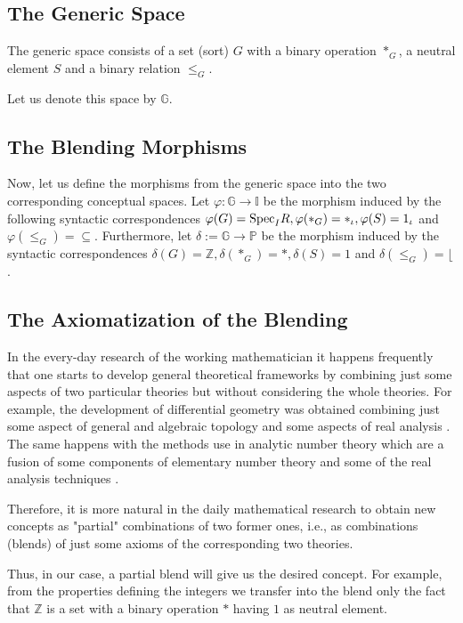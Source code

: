 \subsection{The Generic Space}

The generic space consists of a set (sort) $G$ with a binary operation $*_G$, a neutral element $S$ and a binary relation $\leq_G$.

  Let us denote this space by $\mathbb{G}$.

\subsection{The Blending Morphisms}
Now, let us define the morphisms from the generic space into the two corresponding conceptual spaces. Let $\varphi: \mathbb{G}\rightarrow \mathbb{I}$ be the morphism induced by the following syntactic correspondences $\varphi(G)={\rm Spec}_IR,\varphi(*_G)=*_{\iota}, \varphi(S)=1_{\iota}$ and $\varphi(\leq_G)=\subseteq$.
\newline\indent
Furthermore, let $\delta:=\mathbb{G}\rightarrow\mathbb{P}$ be the morphism induced by the syntactic correspondences $\delta(G)=\mathbb{Z}, \delta(*_G)=*, \delta(S)=1$ and $\delta(\leq_G)= \big\lfloor$.

\subsection{The Axiomatization of the Blending}
In the every-day research of the working mathematician it happens
frequently that one starts to develop general theoretical frameworks
by combining just some aspects of two particular theories but without
considering the whole theories. For example, the development of
differential geometry was obtained combining just some aspect of
general and algebraic topology and some aspects of real analysis
\parencite{VelCad05}. The same happens with the methods use in
analytic number theory which are a fusion of some components of
elementary number theory and some of the real analysis techniques
\parencite{Apostol76}.

Therefore, it is more natural in the daily mathematical research to obtain new concepts as "partial" combinations of two former ones, i.e., as combinations (blends) of just some axioms of the corresponding two theories.
 
Thus, in our case, a partial blend will give us the desired concept. For example, from the properties defining the integers we transfer into the blend only the fact that $\mathbb{Z}$ is a set with a binary operation $*$ having $1$ as neutral element. 

